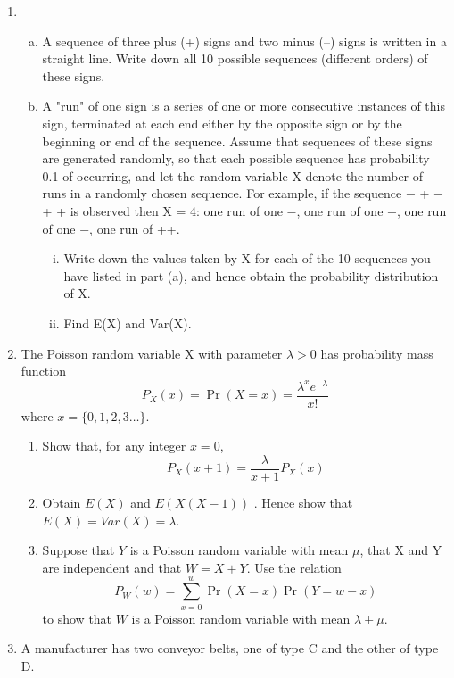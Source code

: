 \documentclass[a4paper,12pt]{article}
\begin{document}
\begin{enumerate}
\item

\begin{enumerate}[(a)]
\item A sequence of three plus (+) signs and two minus (–) signs is written in a straight line. Write down all 10 possible sequences (different orders) of these signs.  
\item  A "run" of one sign is a series of one or more consecutive instances of this sign, terminated at each end either by the opposite sign or by the beginning or end of the sequence. Assume that sequences of these signs are generated randomly, so that each possible sequence has probability 0.1 of occurring, and let the random variable X denote the number of runs in a randomly chosen sequence. For example, if the sequence − + − + + is observed then X = 4: one run of one −, one run of one +, one run of one −, one run of ++. 
\begin{enumerate}[(i)]
\item Write down the values taken by X for each of the 10 sequences you have listed in part (a), and hence obtain the probability distribution of X. 
\item Find E(X) and Var(X). 
\end{enumerate}

\end{enumerate}



\item The Poisson random variable X with parameter $\lambda > 0$ has probability mass function
\[ {\displaystyle P_X(x) =\Pr(X=x)={\frac {\lambda ^{x}e^{-\lambda }}{x!}}} \]
where $x = \{0,1,2,3 \ldots\}$.
\begin{enumerate}
\item  Show that, for any integer $x = 0$,
\[ {\displaystyle P_X(x+1) = \frac{\lambda}{x+1} P_X(x) }\]

\item  Obtain $E( X )$ and $E(X ( X - 1))$ . Hence show that $E(X ) = Var( X ) = \lambda  $.
\item  Suppose that $Y$ is a Poisson random variable with mean $\mu$, that X and Y are
independent and that $W = X + Y$. Use the relation
\[  P_{W}(w) =  \sum^{w}_{x=0} \Pr( X  = x ) \Pr (Y =  w - x)
 \]
to show that $W$ is a Poisson random variable with mean $\lambda + \mu$.
\end{enumerate}
\item  A manufacturer has two conveyor belts, one of type C and the other of type D.


\end{enumerate}
\end{document}

